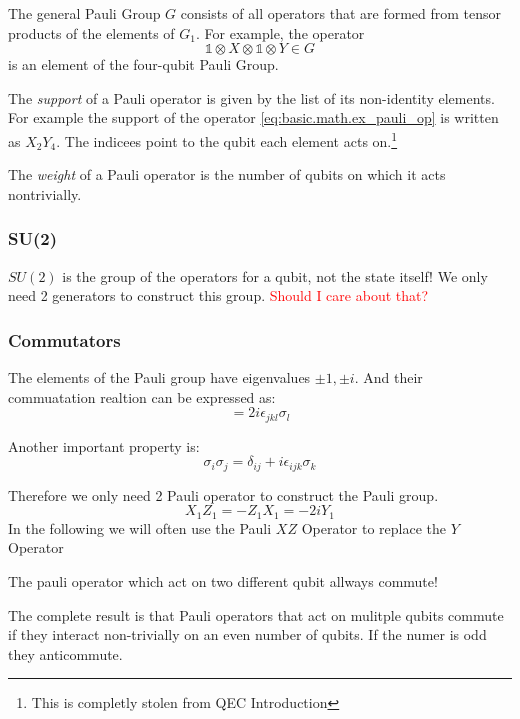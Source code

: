 The general Pauli Group $G$ consists of all operators that are formed from tensor products of the elements of $G_1$. 
For example, the operator
\begin{equation}
    \mathds{1} \otimes X \otimes \mathds{1} \otimes Y \in G
    \label{eq:basic.math.ex_pauli_op}
\end{equation}
is an element of the four-qubit Pauli Group. 

The \textit{support} of a Pauli operator is given by the list of its non-identity elements.
For example the support of the operator \ref{eq:basic.math.ex_pauli_op} is written as $X_2Y_4$.
The indicees point to the qubit each element acts on.\footnote{This is completly stolen from QEC Introduction} \cite{QECintro}

The \textit{weight} of a Pauli operator is the number of qubits on which it acts nontrivially. \cite{QECmemory}

\subsubsection{SU(2)}
$SU(2)$ is the group of the operators for a qubit, not the state itself!
We only need 2 generators to construct this group.
\textcolor{red}{Should I care about that?}


\subsubsection{Commutators}
The elements of the Pauli group have eigenvalues ${\pm 1,\pm i}$.
And their commuatation realtion can be expressed as:
\begin{equation}
    [\sigma_j,\sigma_k] = 2 i \epsilon_{jkl} \sigma_l
\end{equation}

Another important property is:
\begin{equation}
    \sigma_i \sigma_j = \delta_{ij} + i \epsilon_{ijk} \sigma_k
\end{equation}

Therefore we only need 2 Pauli operator to construct the Pauli group.
\begin{equation}
    X_1 Z_1 = - Z_1 X_1 = -2 i Y_1
\end{equation}
In the following we will often use the Pauli $XZ$ Operator to replace the $Y$ Operator 

The pauli operator which act on two different qubit allways commute!

The complete result is that Pauli operators that act on mulitple qubits commute if they interact non-trivially on an even number of qubits.
If the numer is odd they anticommute.


